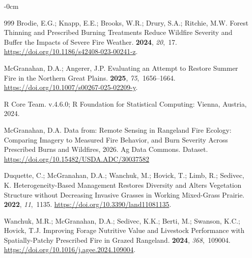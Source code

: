 \documentclass[fire,article,accept,oneauthor,pdftex]{Definitions/mdpi}
\begin{document}
\begin{adjustwidth}{-\extralength}{0cm}
\begin{thebibliography}{999}
Brodie, E.G.; Knapp, E.E.; Brooks, W.R.; Drury, S.A.; Ritchie, M.W.
\newblock Forest Thinning and Prescribed Burning Treatments Reduce Wildfire
  Severity and Buffer the Impacts of Severe Fire Weather.
 {\bf 2024}, {\em 20},~17.
\newblock
  \url{https://doi.org/10.1186/s42408-023-00241-z}.

McGranahan, D.A.; Angerer, J.P.
\newblock Evaluating an Attempt to Restore Summer Fire in the {{Northern Great
  Plains}}.
 {\bf 2025}, {\em 75},~1656--1664.
\newblock
  \url{https://doi.org/10.1007/s00267-025-02209-y}.

{R Core Team}.
 v.4.6.0;
\newblock R Foundation for Statistical Computing:
 Vienna, Austria,  2024.

McGranahan, D.A.
\newblock Data from: Remote Sensing in Rangeland Fire Ecology:
  Comparing Imagery to Measured Fire Behavior, and Burn Severity Across
  Prescribed Burns and Wildfires,  2026.
\newblock Ag Data Commons. Dataset. 
\newblock \url{https://doi.org/10.15482/USDA.ADC/30037582}

Duquette, C.; McGranahan, D.A.; Wanchuk, M.; Hovick, T.; Limb, R.; Sedivec, K.
\newblock Heterogeneity-Based Management Restores Diversity and Alters
  Vegetation Structure without Decreasing Invasive Grasses in Working
  Mixed-Grass Prairie.
 {\bf 2022}, {\em 11},~1135.
\newblock
  \url{https://doi.org/10.3390/land11081135}.

Wanchuk, M.R.; McGranahan, D.A.; Sedivec, K.K.; Berti, M.; Swanson, K.C.;
  Hovick, T.J.
\newblock Improving Forage Nutritive Value and Livestock Performance with
  Spatially-Patchy Prescribed Fire in Grazed Rangeland.
 {\bf 2024}, {\em
  368},~109004.
\newblock
  \url{https://doi.org/10.1016/j.agee.2024.109004}.


\end{thebibliography}
\end{adjustwidth}
\end{document}

